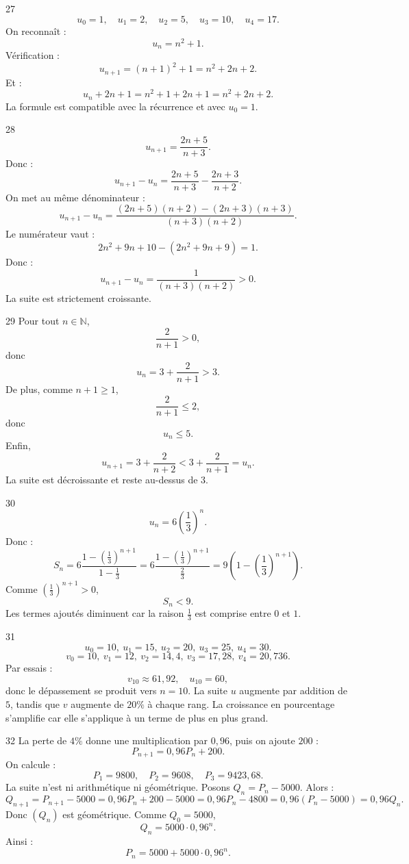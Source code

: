 \documentclass[11pt,a4paper]{article}
\newcommand{\N}{\mathbb{N}}
\begin{document}
\begin{solbox}{27}
\[
u_0=1,\quad u_1=2,\quad u_2=5,\quad u_3=10,\quad u_4=17.
\]
On reconnaît :
\[
u_n=n^2+1.
\]
Vérification :
\[
u_{n+1}=(n+1)^2+1=n^2+2n+2.
\]
Et :
\[
u_n+2n+1=n^2+1+2n+1=n^2+2n+2.
\]
La formule est compatible avec la récurrence et avec \(u_0=1\).
\end{solbox}

\begin{solbox}{28}
\[
u_{n+1}=\frac{2n+5}{n+3}.
\]
Donc :
\[
u_{n+1}-u_n=\frac{2n+5}{n+3}-\frac{2n+3}{n+2}.
\]
On met au même dénominateur :
\[
u_{n+1}-u_n=\frac{(2n+5)(n+2)-(2n+3)(n+3)}{(n+3)(n+2)}.
\]
Le numérateur vaut :
\[
2n^2+9n+10-(2n^2+9n+9)=1.
\]
Donc :
\[
u_{n+1}-u_n=\frac{1}{(n+3)(n+2)}>0.
\]
La suite est strictement croissante.
\end{solbox}

\begin{solbox}{29}
Pour tout \(n\in\N\),
\[
\frac{2}{n+1}>0,
\]
donc
\[
u_n=3+\frac{2}{n+1}>3.
\]
De plus, comme \(n+1\geq1\),
\[
\frac{2}{n+1}\leq2,
\]
donc
\[
u_n\leq5.
\]
Enfin,
\[
u_{n+1}=3+\frac{2}{n+2}<3+\frac{2}{n+1}=u_n.
\]
La suite est décroissante et reste au-dessus de \(3\).
\end{solbox}

\begin{solbox}{30}
\[
u_n=6\left(\frac13\right)^n.
\]
Donc :
\[
S_n=6\frac{1-\left(\frac13\right)^{n+1}}{1-\frac13}
=6\frac{1-\left(\frac13\right)^{n+1}}{\frac23}
=9\left(1-\left(\frac13\right)^{n+1}\right).
\]
Comme \(\left(\frac13\right)^{n+1}>0\),
\[
S_n<9.
\]
Les termes ajoutés diminuent car la raison \(\frac13\) est comprise entre \(0\) et \(1\).
\end{solbox}

\begin{solbox}{31}
\[
u_0=10,\ u_1=15,\ u_2=20,\ u_3=25,\ u_4=30.
\]
\[
v_0=10,\ v_1=12,\ v_2=14{,}4,\ v_3=17{,}28,\ v_4=20{,}736.
\]
Par essais :
\[
v_{10}\approx61{,}92,\quad u_{10}=60,
\]
donc le dépassement se produit vers \(n=10\).  
La suite \(u\) augmente par addition de \(5\), tandis que \(v\) augmente de \(20\%\) à chaque rang. La croissance en pourcentage s'amplifie car elle s'applique à un terme de plus en plus grand.
\end{solbox}

\begin{solbox}{32}
La perte de \(4\%\) donne une multiplication par \(0{,}96\), puis on ajoute \(200\) :
\[
P_{n+1}=0{,}96P_n+200.
\]
On calcule :
\[
P_1=9800,\quad P_2=9608,\quad P_3=9423{,}68.
\]
La suite n'est ni arithmétique ni géométrique.  
Posons \(Q_n=P_n-5000\). Alors :
\[
Q_{n+1}=P_{n+1}-5000=0{,}96P_n+200-5000
=0{,}96P_n-4800=0{,}96(P_n-5000)=0{,}96Q_n.
\]
Donc \((Q_n)\) est géométrique. Comme \(Q_0=5000\),
\[
Q_n=5000\cdot0{,}96^n.
\]
Ainsi :
\[
P_n=5000+5000\cdot0{,}96^n.
\]
\end{solbox}
\end{document}
